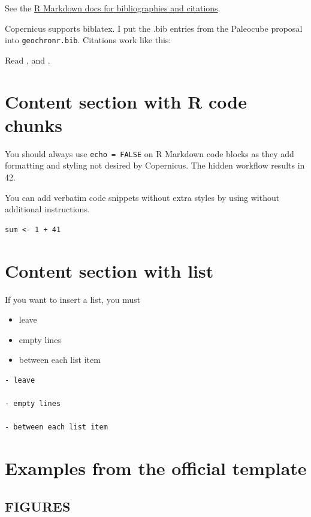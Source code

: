 \documentclass[gc, manuscript]{copernicus}
\begin{document}
See the
\href{http://rmarkdown.rstudio.com/authoring_bibliographies_and_citations.html}{R
Markdown docs for bibliographies and citations}.

Copernicus supports biblatex. I put the .bib entries from the Paleocube
proposal into \texttt{geochronr.bib}. Citations work like this:

Read \citep{Evans_QSR13}, and \citep[see][]{PRYSM}.

\section{Content section with R code chunks}

You should always use \texttt{echo\ =\ FALSE} on R Markdown code blocks
as they add formatting and styling not desired by Copernicus. The hidden
workflow results in 42.

You can add verbatim code snippets without extra styles by using
\texttt{\textasciigrave{}\textasciigrave{}\textasciigrave{}} without
additional instructions.

\begin{verbatim}
sum <- 1 + 41
\end{verbatim}

\section{Content section with list}

If you want to insert a list, you must

\begin{itemize}
\item
  leave
\item
  empty lines
\item
  between each list item
\end{itemize}

\begin{verbatim}
- leave

- empty lines

- between each list item
\end{verbatim}

\section{Examples from the official template}

\subsection{FIGURES}
\end{document}
